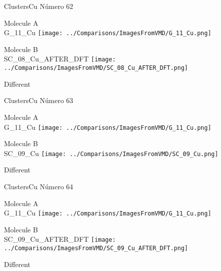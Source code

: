  \newpage

\vtab[-3cm]
\begin{center}
{\large ClustersCu \tab Número 62}
\end{center}
\begin{multicols}{2}
\begin{center}
Molecule A \\ 
G\_11\_Cu
\texttt{[image: ../Comparisons/ImagesFromVMD/G\_11\_Cu.png]}
\\
\vtab

\columnbreak
Molecule B \\ 
SC\_08\_Cu\_AFTER\_DFT
\texttt{[image: ../Comparisons/ImagesFromVMD/SC\_08\_Cu\_AFTER\_DFT.png]}
\\
\vtab


\end{center}
\end{multicols}
\begin{center}
\textcolor{NavyBlue}{\Large Different}
\end{center}

 \newpage

\vtab[-3cm]
\begin{center}
{\large ClustersCu \tab Número 63}
\end{center}
\begin{multicols}{2}
\begin{center}
Molecule A \\ 
G\_11\_Cu
\texttt{[image: ../Comparisons/ImagesFromVMD/G\_11\_Cu.png]}
\\
\vtab

\columnbreak
Molecule B \\ 
SC\_09\_Cu
\texttt{[image: ../Comparisons/ImagesFromVMD/SC\_09\_Cu.png]}
\\
\vtab


\end{center}
\end{multicols}
\begin{center}
\textcolor{NavyBlue}{\Large Different}
\end{center}

 \newpage

\vtab[-3cm]
\begin{center}
{\large ClustersCu \tab Número 64}
\end{center}
\begin{multicols}{2}
\begin{center}
Molecule A \\ 
G\_11\_Cu
\texttt{[image: ../Comparisons/ImagesFromVMD/G\_11\_Cu.png]}
\\
\vtab

\columnbreak
Molecule B \\ 
SC\_09\_Cu\_AFTER\_DFT
\texttt{[image: ../Comparisons/ImagesFromVMD/SC\_09\_Cu\_AFTER\_DFT.png]}
\\
\vtab


\end{center}
\end{multicols}
\begin{center}
\textcolor{NavyBlue}{\Large Different}
\end{center}

